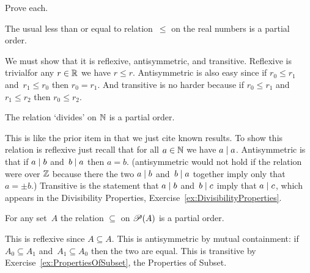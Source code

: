 \documentclass{test}  %
\begin{document}
\begin{problem} Prove each.
\begin{exes}
\begin{exercise}
  The usual less than or equal to relation~$\leq$ on 
  the real numbers is a partial order.
\end{exercise}
\begin{answer}
  We must show that it is reflexive, antisymmetric, and transitive.
  Reflexive is trivial\Dash for any $r\in\mathbb{R}$ we have $r\leq r$.
  Antisymmetric is also easy since if $r_0\leq r_1$ and~$r_1\leq r_0$
  then $r_0=r_1$.
  And transitive is no harder because if $r_0\leq r_1$ and~$r_1\leq r_2$
  then $r_0\leq r_2$.  
\end{answer}
\begin{exercise} 
  The relation `divides' on $\mathbb{N}$ is a partial order.
\end{exercise}
\begin{answer}
  This is like the prior item in that we just cite known results.
  To show this relation is reflexive just recall that for all $a\in\mathbb{N}$ we have
  $a\mid a$.
  Antisymmetric is that if $a\mid b$ and~$b\mid a$ then
  $a=b$.
  (\remark antisymmetric would not hold if the relation were over
  $\mathbb{Z}$ because there the two $a\mid b$ and~$b\mid a$ together imply
  only that $a=\pm b$.)
  Transitive is the statement that $a\mid b$ and~$b\mid c$ imply
  that $a\mid c$, which appears
  in the Divisibility Properties, Exercise~\ref{ex:DivisibilityProperties}.  
\end{answer}
\begin{exercise} 
  For any set~$A$ the relation $\subseteq$ on $\mathscr{P}(A)$ is
  a partial order.
\end{exercise}
\begin{answer}
  This is reflexive since $A\subseteq A$.
  This is antisymmetric by mutual containment: 
  if $A_0\subseteq A_1$ and~$A_1\subseteq A_0$ then the two are equal.
  This is transitive by Exercise~\ref{ex:PropertiesOfSubset}, 
  the Properties of Subset.  
\end{answer}
\end{exes}

\end{problem}
\end{document}
